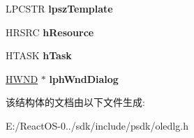 \begin{DoxyCompactItemize}
L\+P\+C\+S\+TR {\bfseries lpsz\+Template}
\item 
\mbox{\label{structtag_o_l_e_u_i_b_u_s_y_a_a1b6c70d848556ab868094bf707a49e85}} 
H\+R\+S\+RC {\bfseries h\+Resource}
\item 
\mbox{\label{structtag_o_l_e_u_i_b_u_s_y_a_a12faf43811f270c527a03b7d9c1586bd}} 
H\+T\+A\+SK {\bfseries h\+Task}
\item 
\mbox{\label{structtag_o_l_e_u_i_b_u_s_y_a_aa4d7a843d6713ac44e1f0937f3dbf987}} 
\hyperlink{interfacevoid}{H\+W\+ND} $\ast$ {\bfseries lph\+Wnd\+Dialog}
\end{DoxyCompactItemize}


该结构体的文档由以下文件生成\+:\begin{DoxyCompactItemize}
\item 
E\+:/\+React\+O\+S-\/0../sdk/include/psdk/oledlg.\+h\end{DoxyCompactItemize}
